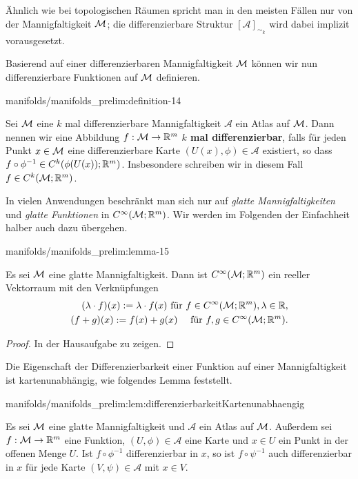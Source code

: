 \par
Ähnlich wie bei topologischen Räumen spricht man in den meisten Fällen nur von der Mannigfaltigkeit \(\mathcal{M}\); die differenzierbare Struktur \([\mathcal{A}]_{\sim_k}\) wird dabei implizit vorausgesetzt.

\par
Basierend auf einer differenzierbaren Mannigfaltigkeit \(\mathcal{M}\) können wir nun differenzierbare Funktionen auf \(\mathcal{M}\) definieren.
\begin{definition}{}{manifolds/manifolds_prelim:definition-14}



\par
Sei \(\mathcal{M}\) eine \(k\) mal differenzierbare Mannigfaltigkeit \(\mathcal{A}\) ein Atlas auf \(\mathcal{M}\).
Dann nennen wir eine Abbildung \(f:\mathcal{M}\to\mathbb{R}^m\) \textbf{\(k\) mal differenzierbar}, falls für jeden Punkt \(x\in\mathcal{M}\) eine differenzierbare Karte \((U(x),\phi)\in\mathcal{A}\) existiert, so dass \(f\circ\phi^{-1} \in C^k(\phi(U(x)); \mathbb{R}^m)\).
Insbesondere schreiben wir in diesem Fall \(f\in C^k(\mathcal{M}; \mathbb{R}^m)\).
\end{definition}

\par
In vielen Anwendungen beschränkt man sich nur auf \emph{glatte Mannigfaltigkeiten} und \emph{glatte Funktionen} in \(C^\infty(\mathcal{M}; \mathbb{R}^m)\).
Wir werden im Folgenden der Einfachheit halber auch dazu übergehen.
\begin{lemma}{}{manifolds/manifolds_prelim:lemma-15}



\par
Es sei \(\mathcal{M}\) eine glatte Mannigfaltigkeit.
Dann ist \(C^\infty(\mathcal{M}; \mathbb{R}^m)\) ein reeller Vektorraum mit den Verknüpfungen
\begin{align*}
(\lambda \cdot f)(x) := \lambda\cdot f(x)\text{ für } f\in C^\infty(\mathcal{M}; \mathbb{R}^m), \lambda\in\mathbb{R},\\
(f + g)(x) := f(x) + g(x)\quad\text{ für } f,g\in C^\infty(\mathcal{M}; \mathbb{R}^m).
\end{align*}\end{lemma}

\begin{proof}
 In der Hausaufgabe zu zeigen.
\end{proof}

\par
Die Eigenschaft der Differenzierbarkeit einer Funktion auf einer Mannigfaltigkeit ist kartenunabhängig, wie folgendes Lemma feststellt.
\begin{lemma}{}{manifolds/manifolds_prelim:lem:differenzierbarkeitKartenunabhaengig}



\par
Es sei \(\mathcal{M}\) eine glatte Mannigfaltigkeit und \(\mathcal{A}\) ein Atlas auf \(\mathcal{M}\).
Außerdem sei \(f:\mathcal{M} \to \mathbb{R}^m\) eine Funktion, \((U,\phi)\in \mathcal{A}\) eine Karte und \(x \in U\) ein Punkt in der offenen Menge \(U\).
Ist \(f\circ\phi^{-1}\) differenzierbar in \(x\), so ist \(f\circ\psi^{-1}\) auch differenzierbar in \(x\) für jede Karte \((V,\psi) \in \mathcal{A}\) mit \(x\in V\).
\end{lemma}

